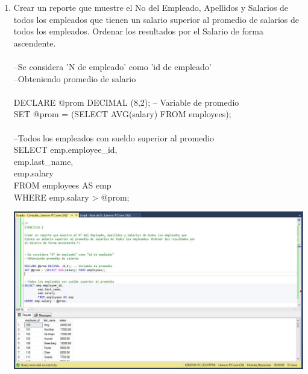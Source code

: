 \begin{enumerate}[1.]
	\item Crear un reporte que muestre el No del Empleado, Apellidos y Salarios de todos los empleados que tienen un salario superior al promedio de salarios de todos los empleados. Ordenar los resultados por el Salario de forma ascendente.
	\\
\\--Se considera 'N de empleado' como 'id de empleado'
\\--Obteniendo promedio de salario
\\
\\DECLARE @prom DECIMAL (8,2); -- Variable de promedio
\\SET @prom = (SELECT AVG(salary) FROM employees);
\\
\\--Todos los empleados con sueldo superior al promedio
\\SELECT emp.employee\_id,
\\		emp.last\_name,
\\		emp.salary
\\		FROM employees AS emp
\\WHERE emp.salary > @prom;\\

	\begin{center}
	\includegraphics[width=17cm]{./Imagenes/Actividad9-Ejercicio02} 
	\end{center}


\end{enumerate}
